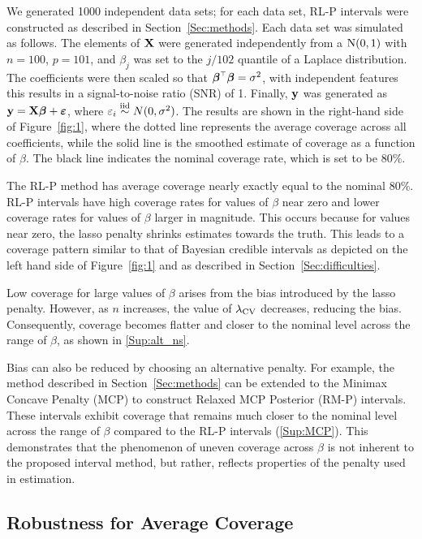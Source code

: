 We generated 1000 independent data sets; for each data set, RL-P intervals were constructed as described in Section~\ref{Sec:methods}. Each data set was simulated as follows. The elements of $\mathbf{X}$ were generated independently from a $\textrm{N}(0, 1)$ with $n = 100$, $p = 101$, and $\beta_j$ was set to the $j/102$ quantile of a Laplace distribution. The coefficients were then scaled so that $\boldsymbol{\beta} ^{\scriptscriptstyle\top}\boldsymbol{\beta} = \sigma^2$, with independent features this results in a signal-to-noise ratio (SNR) of 1. Finally, $\mathbf{y}$ was generated as $\mathbf{y} = \mathbf{X}\boldsymbol{\beta} + \boldsymbol{\varepsilon}$, where $\varepsilon_i \overset{\text{iid}}{\sim} N(0, \sigma^2)$. The results are shown in the right-hand side of Figure~\ref{fig:1}, where the dotted line represents the average coverage across all coefficients, while the solid line is the smoothed estimate of coverage as a function of $\beta$. The black line indicates the nominal coverage rate, which is set to be 80\%.

The RL-P method has average coverage nearly exactly equal to the nominal 80\%. RL-P intervals have high coverage rates for values of $\beta$ near zero and lower coverage rates for values of $\beta$ larger in magnitude. This occurs because for values near zero, the lasso penalty shrinks estimates towards the truth. This leads to a coverage pattern similar to that of Bayesian credible intervals as depicted on the left hand side of Figure~\ref{fig:1} and as described in Section~\ref{Sec:difficulties}.

Low coverage for large values of $\beta$ arises from the bias introduced by the lasso penalty. However, as $n$ increases, the value of $\lambda_{\textrm{CV}}$ decreases, reducing the bias. Consequently, coverage becomes flatter and closer to the nominal level across the range of $\beta$, as shown in \ref{Sup:alt_ns}.

Bias can also be reduced by choosing an alternative penalty. For example, the method described in Section~\ref{Sec:methods} can be extended to the Minimax Concave Penalty (MCP) to construct Relaxed MCP Posterior (RM-P) intervals. These intervals exhibit coverage that remains much closer to the nominal level across the range of $\beta$ compared to the RL-P intervals (\ref{Sup:MCP}). This demonstrates that the phenomenon of uneven coverage across $\beta$ is not inherent to the proposed interval method, but rather, reflects properties of the penalty used in estimation.

\subsection{Robustness for Average Coverage}
\label{Sec:robustness}

